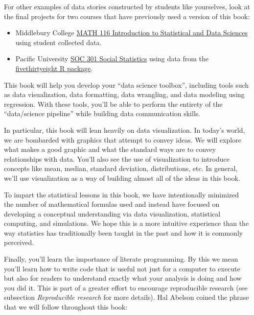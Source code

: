 \documentclass[
  letterpaper,
  DIV=11,
  numbers=noendperiod]{scrreprt}
\providecommand{\tightlist}{%
  \setlength{\itemsep}{0pt}\setlength{\parskip}{0pt}}\usepackage{longtable,booktabs,array}
\theoremstyle{definition}
\theoremstyle{remark}
\begin{document}
For other examples of data stories constructed by students like
yourselves, look at the final projects for two courses that have
previously used a version of this book:

\begin{itemize}
\tightlist
\item
  Middlebury College
  \href{https://rudeboybert.github.io/MATH116/PS/final_project/final_project_outline.html\#past_examples}{MATH
  116 Introduction to Statistical and Data Sciences} using student
  collected data.
\item
  Pacific University
  \href{https://ismayc.github.io/soc301_s2017/group-projects/index.html}{SOC
  301 Social Statistics} using data from the
  \href{https://cran.r-project.org/web/packages/fivethirtyeight/vignettes/fivethirtyeight.html}{fivethirtyeight
  R package}.
\end{itemize}

This book will help you develop your ``data science toolbox'', including
tools such as data visualization, data formatting, data wrangling, and
data modeling using regression. With these tools, you'll be able to
perform the entirety of the ``data/science pipeline'' while building
data communication skills.

In particular, this book will lean heavily on data visualization. In
today's world, we are bombarded with graphics that attempt to convey
ideas. We will explore what makes a good graphic and what the standard
ways are to convey relationships with data. You'll also see the use of
visualization to introduce concepts like mean, median, standard
deviation, distributions, etc. In general, we'll use visualization as a
way of building almost all of the ideas in this book.

To impart the statistical lessons in this book, we have intentionally
minimized the number of mathematical formulas used and instead have
focused on developing a conceptual understanding via data visualization,
statistical computing, and simulations. We hope this is a more intuitive
experience than the way statistics has traditionally been taught in the
past and how it is commonly perceived.

Finally, you'll learn the importance of literate programming. By this we
mean you'll learn how to write code that is useful not just for a
computer to execute but also for readers to understand exactly what your
analysis is doing and how you did it. This is part of a greater effort
to encourage reproducible research (see subsection \emph{Reproducible
research} for more details). Hal Abelson coined the phrase that we will
follow throughout this book:
\end{document}
